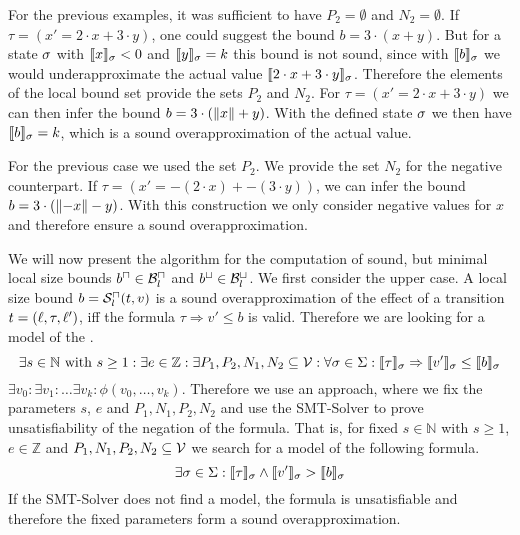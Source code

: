 For the previous examples, it was sufficient to have $P_2 = \emptyset$ and $N_2 = \emptyset$.
If $\tau = (x' = 2 \cdot x + 3 \cdot y)$, one could suggest the bound $b = 3 \cdot (x + y)$.
But for a state $\sigma$ with $\llbracket x \rrbracket_{\sigma} < 0$ and $\llbracket y \rrbracket_{\sigma} = k$ this bound is not sound, since with $\llbracket b \rrbracket_{\sigma}$ we would underapproximate the actual value $\llbracket 2 \cdot x + 3 \cdot y \rrbracket_{\sigma}$.
Therefore the elements of the local bound set provide the sets $P_2$ and $N_2$.
For $\tau = (x' = 2 \cdot x + 3 \cdot y)$ we can then infer the bound $b = 3 \cdot (\left\Vert x\right\Vert + y)$.
With the defined state $\sigma$ we then have $\llbracket b \rrbracket_{\sigma} = k$, which is a sound overapproximation of the actual value. 

For the previous case we used the set $P_2$.
We provide the set $N_2$ for the negative counterpart.
If $\tau = (x' = -(2 \cdot x) + -(3 \cdot y))$, we can infer the bound $b = 3 \cdot (\left\Vert-x\right\Vert - y)$.
With this construction we only consider negative values for $x$ and therefore ensure a sound overapproximation.

We will now present the algorithm for the computation of sound, but minimal local size bounds $b^\sqcap \in \mathcal{B}^\sqcap_l$ and $b^\sqcup \in \mathcal{B}^\sqcup_l$.
We first consider the upper case.
A local size bound $b = {\mathcal{S}^\sqcap_l}(t,v)$ is a sound overapproximation of the effect of a transition $t = (\ell,\tau,\ell')$, iff the formula $\tau \Rightarrow v' \leq b$ is valid.
Therefore we are looking for a model of the .
\[ \exists s \in \mathbb{N} \text{ with } s \geq 1:
\exists e \in \mathbb{Z}:
\exists P_1, P_2, N_1, N_2 \subseteq \mathcal{V}:
\forall \sigma \in \Sigma:
\llbracket \tau \rrbracket_{\sigma} \Rightarrow \llbracket v' \rrbracket_{\sigma} \leq \llbracket b \rrbracket_{\sigma} \]
 $\exists v_0: \exists v_1: \dots \exists v_k: \phi(v_0, \dots, v_k)$.
Therefore we use an approach, where we fix the parameters $s$, $e$ and $P_1, N_1, P_2, N_2$ and use the SMT-Solver to prove unsatisfiability of the negation of the formula.
That is, for fixed $s \in \mathbb{N}$ with $s \geq 1$, $e \in \mathbb{Z}$ and $P_1, N_1, P_2, N_2 \subseteq \mathcal{V}$ we search for a model of the following formula.
\[ \exists \sigma \in \Sigma: \llbracket \tau \rrbracket_{\sigma} \wedge \llbracket v' \rrbracket_{\sigma} > \llbracket b \rrbracket_{\sigma} \]
If the SMT-Solver does not find a model, the formula is unsatisfiable and therefore the fixed parameters form a sound overapproximation.

